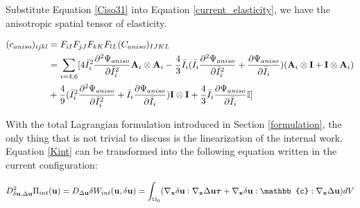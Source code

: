 Substitute Equation \ref{Ciso31} into Equation \ref{current_elasticity}, we have the anisotropic spatial tensor of elasticity.

\begin{equation} \label{spatial_ciso3}
\begin{split}
(c_{aniso})_{ijkl} &=  F_{iI}F_{jJ}F_{kK}F_{lL}(C_{aniso})_{IJKL} \\
&= 
 \sum_{i = 4, 6} [4{\bar{I}_i}^2\frac{\partial^2\Psi_{aniso}}{\partial{\bar{I}_i}^2} \bold{A}_{i} \otimes \bold{A}_{i} - \frac{4}{3}\bar{I}_i(\bar{I}_i\frac{\partial^2\Psi_{aniso}}{\partial{\bar{I}_i}^2} + \frac{\partial\Psi_{aniso}}{\partial{\bar{I}_i}})
 (\bold{A}_{i} \otimes \bold{I} + \bold{I} \otimes \bold{A}_i) \\
&+ \frac{4}{9}({\bar{I}_i}^2\frac{\partial^2\Psi_{aniso}}{\partial{\bar{I}_i}^2} + \bar{I}_i\frac{\partial\Psi_{aniso}}{\partial{\bar{I}_i}})\bold{I} \otimes \bold{I} 
+ \frac{4}{3}\bar{I}_i \frac{\partial\Psi_{aniso}}{\partial{\bar{I}_i}} \mathbb{I}]
\end{split}
\end{equation}

With the total Lagrangian formulation introduced in Section \ref{formulation}, the only thing that is not trivial to discuss is the linearization of the internal work. Equation \ref{Kint} can be transformed into the following equation written in the current configuration:

\begin{equation}
D^2_{\delta\bold{u}, \Delta\bold{u}}\Pi_{int}(\bold{u}) = D_{\Delta{\bold{u}}}\delta{W_{int}}(\bold{u}, \delta{\bold{u}}) = \int_{\Omega_0}(\nabla_{\bold{x}}\delta\bold{u} : \nabla_{\bold{x}}\Delta\bold{u}\boldsymbol{\tau} + \nabla_{\bold{x}}\delta{\bold{u}} : \mathbb{c} :  \nabla_{\bold{x}}\Delta\bold{u})dV
\end{equation}



